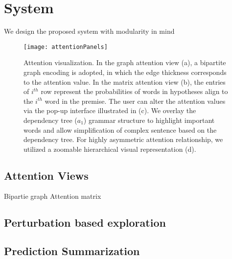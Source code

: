 \section{System}
We design the proposed system with modularity in mind


\begin{figure*}[t]
\centering
\vspace{-2mm}
 \texttt{[image: attentionPanels]}
  \vspace{-6mm}
 \caption{
Attention visualization. In the graph attention view (a), a bipartite graph encoding is adopted, in which the edge thickness corresponds to the attention value. In the matrix attention view (b), the entries of $i^{th}$ row represent the probabilities of words in hypotheses align to the $i^{th}$ word in the premise.
The user can alter the attention values via the pop-up interface illustrated in (c).
We overlay the dependency tree ($a_1$) grammar structure to highlight important words and allow simplification of complex sentence based on the dependency tree.
%
For highly asymmetric attention relationship, we utilized a zoomable hierarchical visual representation (d).
}
\label{fig:pipelineUpdate}
\end{figure*}

\subsection{Attention Views}
Bipartie graph
Attention matrix


\subsection{Perturbation based exploration}
\label{sec:perturb}

\subsection{Prediction Summarization}



